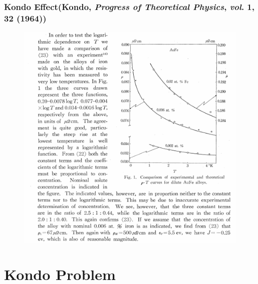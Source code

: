 \documentclass[10pt,aspectratio=43,xcolor=x11names]{beamer}%
\begin{document}
		\begin{frame}\frametitle{Kondo Effect({\footnotesize Kondo, \textit{Progress of Theoretical Physics}, \textit{vol}. \textbf{1}, 32 (1964)})}
			\begin{figure}[!htp]
				\centering
				\includegraphics[scale=0.6]{minimum.pdf}
			\end{figure}
		\end{frame}
		
\section{Kondo Problem}
\end{document}
